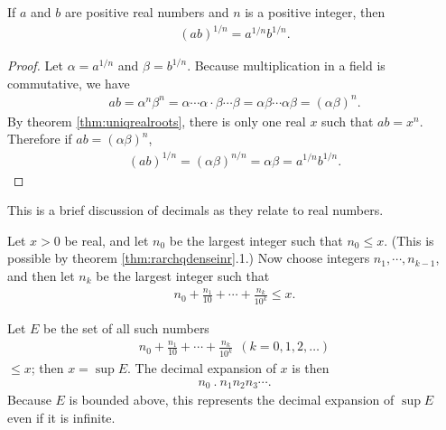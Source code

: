 \documentclass[12pt]{article}
\begin{document}
\begin{cor}
  If $a$ and $b$ are positive real numbers and $n$ is a positive integer, then
  \begin{align*}
    (ab)^{1/n} = a^{1/n}b^{1/n}.
  \end{align*}

  \begin{proof}
    Let $\alpha = a^{1/n}$ and $\beta = b^{1/n}$. Because multiplication in a field
    is commutative, we have
    \begin{align*}
      ab = \alpha^n\beta^n = \alpha \cdots \alpha \cdot \beta \cdots \beta =
      \alpha\beta \cdots \alpha\beta = (\alpha\beta)^n.
    \end{align*}
    By theorem \ref{thm:uniqrealroots}, there is only one real $x$ such that $ab =
    x^n$. Therefore if $ab = (\alpha\beta)^n$,
    \begin{align*}
      (ab)^{1/n} = (\alpha\beta)^{n/n} = \alpha\beta = a^{1/n}b^{1/n}.
    \end{align*}
  \end{proof}
\end{cor}

\begin{comm}
  This is a brief discussion of decimals as they relate to real numbers.

  Let $x > 0$ be real, and let $n_0$ be the largest integer such that $n_0 \leq x$.
  (This is possible by theorem \ref{thm:rarchqdenseinr}.1.) Now choose integers
  $n_1,\cdots,n_{k-1}$, and then let $n_k$ be the largest integer such that
  \begin{align*}
    n_0 + \frac{n_1}{10} + \cdots + \frac{n_k}{10^k} \leq x.
  \end{align*}

  Let $E$ be the set of all such numbers
  \begin{align*}
    n_0 + \frac{n_1}{10} + \cdots + \frac{n_k}{10^k}\ \ (k = 0,1,2,\ldots)
  \end{align*}
  $\leq x$; then $x = \sup E$. The decimal expansion of $x$ is then
  \begin{align*}
    n_0\ .\ n_1n_2n_3\cdots.
  \end{align*}
  Because $E$ is bounded above, this represents the decimal expansion of $\sup E$
  even if it is infinite.
\end{comm}
\end{document}
